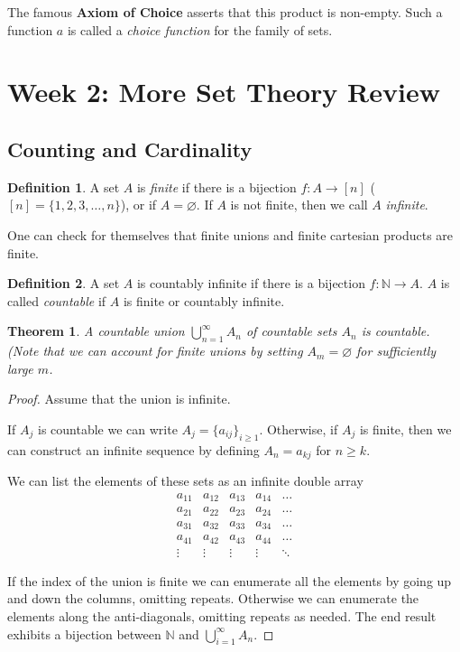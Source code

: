 \documentclass[12pt]{article}
\theoremstyle{plain}
\newtheorem{theorem}{Theorem}
\theoremstyle{definition}
\newtheorem{definition}{Definition}
\begin{document}
The famous \textbf{Axiom of Choice} asserts that this product is non-empty. Such a function $a$ is called a \textit{choice function} for the family of sets.

\section{Week 2: More Set Theory Review}

\subsection{Counting and Cardinality}

\begin{definition}
A set $A$ is \textit{finite} if there is a bijection $f:A \to [n]$ ($[n] = \{1, 2, 3, \dotsc, n\}$), or if $A = \varnothing$.
If $A$ is not finite, then we call $A$ \textit{infinite}.
\end{definition}

One can check for themselves that finite unions and finite cartesian products are finite. 

\begin{definition}
A set $A$ is countably infinite if there is a bijection $f: \mathbb{N} \to A$. $A$ is called \textit{countable} if $A$ is finite or countably infinite.
\end{definition}

\begin{theorem}
A countable union $\bigcup_{n = 1}^{\infty}A_n$ of countable sets $A_n$ is countable. (Note that we can account for finite unions by setting $A_m = \varnothing$ for sufficiently large $m$.
\end{theorem}

\begin{proof}
Assume that the union is infinite.

If $A_j$ is countable we can write $A_j = \{a_{ij}\}_{i \geq 1}$. Otherwise, if $A_j$ is finite, then we can construct an infinite sequence by defining $A_n = a_{kj}$ for $n \geq k$.

We can list the elements of these sets as an infinite double array 
\[
\begin{matrix}
a_{11} & a_{12} & a_{13} & a_{14} & \dots \\
a_{21} & a_{22} & a_{23} & a_{24} & \dots \\
a_{31} & a_{32} & a_{33} & a_{34} & \dots \\
a_{41} & a_{42} & a_{43} & a_{44} & \dots \\
\vdots &\vdots &\vdots &\vdots & \ddots 
\end{matrix}
\]

If the index of the union is finite we can enumerate all the elements by going up and down the columns, omitting repeats. Otherwise we can enumerate the elements along the anti-diagonals, omitting repeats as needed. The end result exhibits a bijection between $\mathbb{N}$ and $\bigcup_{i = 1}^{\infty}A_n$.
\end{proof}
\end{document}
